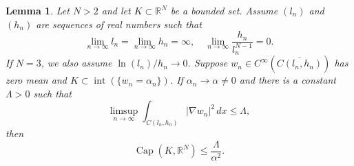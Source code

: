 \documentclass{article}
\numberwithin{equation}{section}
\newtheorem{lemma}[theorem]{Lemma}
\theoremstyle{definition}
\theoremstyle{remark}
\newcommand{\cpct}{\operatorname{Cap}}
\newcommand{\topint}{\operatorname{int}}
\begin{document}
\begin{lemma} \label{lm:infinite_height}
    Let $N > 2$ and let $K \subset \mathbb{R}^N$ be a bounded set. Assume $(l_n)$ and $(h_n)$ are sequences of real numbers such that
    \[
    \lim_{n \to \infty} l_n = \lim_{n \to \infty} h_n = \infty, \quad \lim_{n \to \infty} \frac{h_n}{l_n^{N - 1}} = 0.
    \]
    If $N = 3$, we also assume $\ln(l_n)/h_n \to 0$. Suppose $w_n \in C^\infty(\overline{C(l_n, h_n)})$ has zero mean and $K \subset \topint(\{w_n = \alpha_n\})$. If $\alpha_n \to \alpha \neq 0$ and there is a constant $\Lambda > 0$ such that
    \begin{equation} \label{eq:finite_limsup}
        \limsup_{n \to \infty} \int_{C(l_n, h_n)} |\nabla w_n|^2 \, dx \le \Lambda,
    \end{equation}
    then
    \[
    \cpct(K, \mathbb{R}^N) \le \frac{\Lambda}{\alpha^2}.
    \]
\end{lemma}
\end{document}
